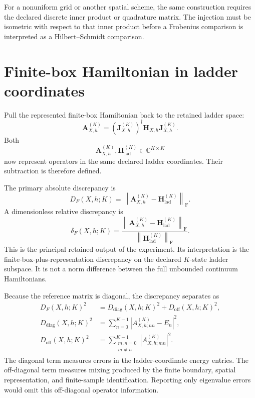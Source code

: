 For a nonuniform grid or another spatial scheme, the same construction requires
the declared discrete inner product or quadrature matrix. The injection must be
isometric with respect to that inner product before a Frobenius comparison is
interpreted as a Hilbert--Schmidt comparison.

\section{Finite-box Hamiltonian in ladder coordinates}

Pull the represented finite-box Hamiltonian back to the retained ladder space:
\begin{equation}
    \mathbf A_{X,h}^{(K)}
    =
    \left(\mathbf J_{X,h}^{(K)}\right)^\dagger
    \mathbf H_{X,h}
    \mathbf J_{X,h}^{(K)}.
\end{equation}
Both
\begin{equation}
    \mathbf A_{X,h}^{(K)},
    \mathbf H_{\mathrm{lad}}^{(K)}
    \in
    \mathbb C^{K\times K}
\end{equation}
now represent operators in the same declared ladder coordinates. Their
subtraction is therefore defined.

The primary absolute discrepancy is
\begin{equation}
    D_F(X,h;K)
    =
    \left\lVert
        \mathbf A_{X,h}^{(K)}
        -
        \mathbf H_{\mathrm{lad}}^{(K)}
    \right\rVert_{\mathrm F}.
\end{equation}
A dimensionless relative discrepancy is
\begin{equation}
    \delta_F(X,h;K)
    =
    \frac{
        \left\lVert
            \mathbf A_{X,h}^{(K)}
            -
            \mathbf H_{\mathrm{lad}}^{(K)}
        \right\rVert_{\mathrm F}
    }{
        \left\lVert
            \mathbf H_{\mathrm{lad}}^{(K)}
        \right\rVert_{\mathrm F}
    }.
\end{equation}
This is the principal retained output of the experiment. Its interpretation is
the finite-box-plus-representation discrepancy on the declared $K$-state
ladder subspace. It is not a norm difference between the full unbounded
continuum Hamiltonians.

Because the reference matrix is diagonal, the discrepancy separates as
\begin{align}
    D_F(X,h;K)^2
    &=
    D_{\mathrm{diag}}(X,h;K)^2
    +
    D_{\mathrm{off}}(X,h;K)^2,
    \\
    D_{\mathrm{diag}}(X,h;K)^2
    &=
    \sum_{n=0}^{K-1}
    \left|
        A_{X,h;nn}^{(K)}-E_n
    \right|^2,
    \\
    D_{\mathrm{off}}(X,h;K)^2
    &=
    \sum_{\substack{m,n=0\\m\neq n}}^{K-1}
    \left|
        A_{X,h;mn}^{(K)}
    \right|^2.
\end{align}
The diagonal term measures errors in the ladder-coordinate energy entries. The
off-diagonal term measures mixing produced by the finite boundary, spatial
representation, and finite-sample identification. Reporting only eigenvalue
errors would omit this off-diagonal operator information.

